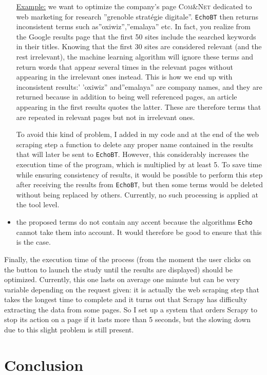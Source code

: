 \documentclass[12pt]{article}
\begin{document}
\begin{itemize}
	\underline{Example:} we want to optimize the company's page \textsc{Com\&Net} dedicated to web marketing for research ''grenoble stratégie digitale''. \texttt{EchoBT} then returns inconsistent terms such as''oxiwiz'',''emalaya'' etc. In fact, you realize from the Google results page that the first 50 sites include the searched keywords in their titles. Knowing that the first 30 sites are considered relevant (and the rest irrelevant), the machine learning algorithm will ignore these terms and return words that appear several times in the relevant pages without appearing in the irrelevant ones instead. This is how we end up with inconsistent results:' 'oxiwiz'' and''emalaya'' are company names, and they are returned because in addition to being well referenced pages, an article appearing in the first results quotes the latter. These are therefore terms that are repeated in relevant pages but not in irrelevant ones.
	
	To avoid this kind of problem, I added in my code and at the end of the web scraping step a function to delete any proper name contained in the results that will later be sent to \texttt{EchoBT}. However, this considerably increases the execution time of the program, which is multiplied by at least 5. To save time while ensuring consistency of results, it would be possible to perform this step after receiving the results from \texttt{EchoBT}, but then some terms would be deleted without being replaced by others. Currently, no such processing is applied at the tool level.
	\item the proposed terms do not contain any accent because the algorithms \texttt{Echo} cannot take them into account. It would therefore be good to ensure that this is the case.
\end{itemize}
	
	Finally, the execution time of the process (from the moment the user clicks on the button to launch the study until the results are displayed) should be optimized. Currently, this one lasts on average one minute but can be very variable depending on the request given: it is actually the web scraping step that takes the longest time to complete and it turns out that \textsf{Scrapy} has difficulty extracting the data from some pages. So I set up a system that orders \textsf{Scrapy} to stop its action on a page if it lasts more than 5 seconds, but the slowing down due to this slight problem is still present.



\newpage
\section{Conclusion}
\end{document}
